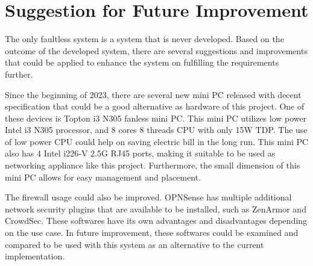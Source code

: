 \documentclass[../index.tex]{subfiles}
\begin{document}
\section{Suggestion for Future Improvement}

The only faultless system is a system that is never developed. Based on the outcome of the developed
system, there are several suggestions and improvements that could be applied to enhance the system
on fulfilling the requirements further.

Since the beginning of 2023, there are several new mini PC released with decent specification that
could be a good alternative as hardware of this project. One of these devices is Topton i3 N305
fanless mini PC. This mini PC utilizes low power Intel i3 N305 processor, and 8 cores 8 threads CPU
with only 15W TDP. The use of low power CPU could help on saving electric bill in the long run. This
mini PC also has 4 Intel i226-V 2.5G RJ45 ports, making it suitable to be used as networking
appliance like this project. Furthermore, the small dimension of this mini PC allows for easy
management and placement.

The firewall usage could also be improved. OPNSense has multiple additional network security plugins
that are available to be installed, such as ZenArmor and CrowdSec. These softwares have its own
advantages and disadvantages depending on the use case. In future improvement, these softwares could
be examined and compared to be used with this system as an alternative to the current
implementation.
\end{document}

